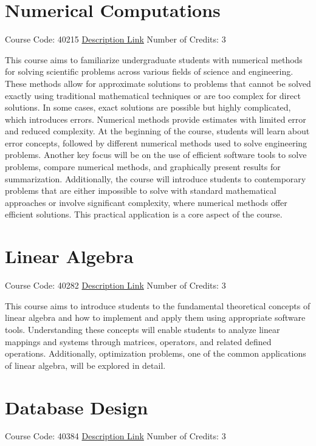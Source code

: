 \section{Numerical Computations}
Course Code: 40215 \qquad \quad \href{https://docs.ce.sharif.edu/course/40215}{Description Link}
\qquad \quad Number of Credits: 3

This course aims to familiarize undergraduate students with numerical methods for solving scientific problems across various fields of science and engineering. These methods allow for approximate solutions to problems that cannot be solved exactly using traditional mathematical techniques or are too complex for direct solutions. In some cases, exact solutions are possible but highly complicated, which introduces errors. Numerical methods provide estimates with limited error and reduced complexity. At the beginning of the course, students will learn about error concepts, followed by different numerical methods used to solve engineering problems. Another key focus will be on the use of efficient software tools to solve problems, compare numerical methods, and graphically present results for summarization. Additionally, the course will introduce students to contemporary problems that are either impossible to solve with standard mathematical approaches or involve significant complexity, where numerical methods offer efficient solutions. This practical application is a core aspect of the course.


\section{Linear Algebra}
Course Code: 40282 \qquad \quad \href{https://docs.ce.sharif.edu/course/40282}{Description Link}
\qquad \quad Number of Credits: 3

This course aims to introduce students to the fundamental theoretical concepts of linear algebra and how to implement and apply them using appropriate software tools. Understanding these concepts will enable students to analyze linear mappings and systems through matrices, operators, and related defined operations. Additionally, optimization problems, one of the common applications of linear algebra, will be explored in detail.


\section{Database Design}
Course Code: 40384 \qquad \quad \href{https://docs.ce.sharif.edu/course/40384}{Description Link}
\qquad \quad Number of Credits: 3

